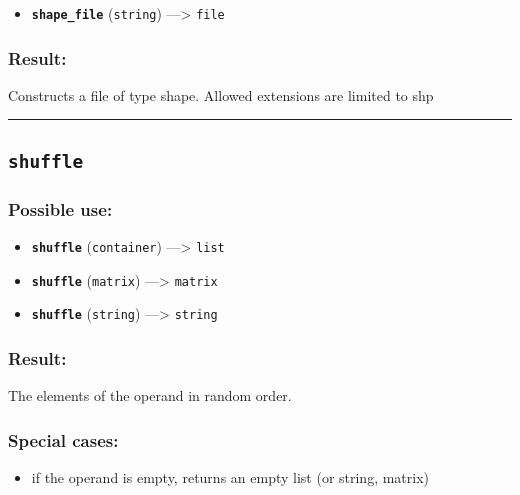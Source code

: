 \documentclass[]{book}
\providecommand{\tightlist}{%
  \setlength{\itemsep}{0pt}\setlength{\parskip}{0pt}}
\theoremstyle{definition}
\theoremstyle{definition}
\theoremstyle{definition}
\theoremstyle{remark}
\begin{document}
\begin{itemize}
\tightlist
\item
  \textbf{\texttt{shape\_file}} (\texttt{string}) ---\textgreater{}
  \texttt{file}
\end{itemize}

\subsubsection{Result:}\label{result-454}

Constructs a file of type shape. Allowed extensions are limited to shp

\begin{center}\rule{0.5\linewidth}{\linethickness}\end{center}

\subsection{\texorpdfstring{\texttt{shuffle}}{shuffle}}\label{shuffle}

\subsubsection{Possible use:}\label{possible-use-471}

\begin{itemize}
\tightlist
\item
  \textbf{\texttt{shuffle}} (\texttt{container}) ---\textgreater{}
  \texttt{list}
\item
  \textbf{\texttt{shuffle}} (\texttt{matrix}) ---\textgreater{}
  \texttt{matrix}
\item
  \textbf{\texttt{shuffle}} (\texttt{string}) ---\textgreater{}
  \texttt{string}
\end{itemize}

\subsubsection{Result:}\label{result-455}

The elements of the operand in random order.

\subsubsection{Special cases:}\label{special-cases-121}

\begin{itemize}
\tightlist
\item
  if the operand is empty, returns an empty list (or string, matrix)
\end{itemize}
\end{document}
